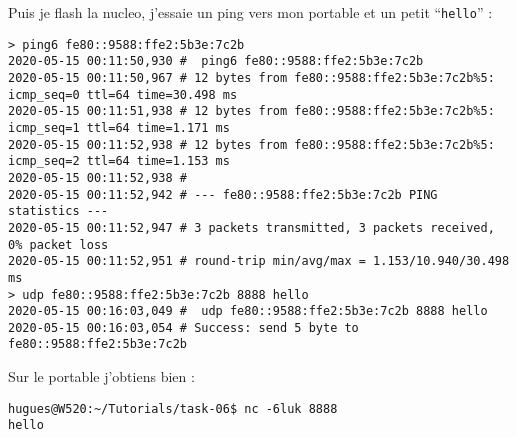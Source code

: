 Puis je flash la nucleo, j'essaie un ping vers mon portable et un petit
\enquote{\texttt{hello}} :
{\scriptsize
\begin{verbatim}
> ping6 fe80::9588:ffe2:5b3e:7c2b
2020-05-15 00:11:50,930 #  ping6 fe80::9588:ffe2:5b3e:7c2b
2020-05-15 00:11:50,967 # 12 bytes from fe80::9588:ffe2:5b3e:7c2b%5: icmp_seq=0 ttl=64 time=30.498 ms
2020-05-15 00:11:51,938 # 12 bytes from fe80::9588:ffe2:5b3e:7c2b%5: icmp_seq=1 ttl=64 time=1.171 ms
2020-05-15 00:11:52,938 # 12 bytes from fe80::9588:ffe2:5b3e:7c2b%5: icmp_seq=2 ttl=64 time=1.153 ms
2020-05-15 00:11:52,938 # 
2020-05-15 00:11:52,942 # --- fe80::9588:ffe2:5b3e:7c2b PING statistics ---
2020-05-15 00:11:52,947 # 3 packets transmitted, 3 packets received, 0% packet loss
2020-05-15 00:11:52,951 # round-trip min/avg/max = 1.153/10.940/30.498 ms
> udp fe80::9588:ffe2:5b3e:7c2b 8888 hello
2020-05-15 00:16:03,049 #  udp fe80::9588:ffe2:5b3e:7c2b 8888 hello
2020-05-15 00:16:03,054 # Success: send 5 byte to fe80::9588:ffe2:5b3e:7c2b
\end{verbatim}
}
Sur le portable j'obtiens bien :
\begin{verbatim}
hugues@W520:~/Tutorials/task-06$ nc -6luk 8888
hello
\end{verbatim}
